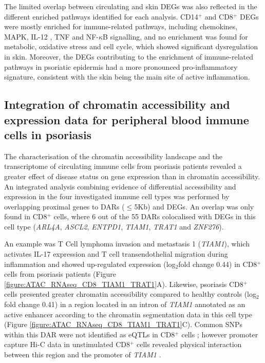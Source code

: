 The limited overlap between circulating and skin DEGs was also reflected in the different enriched pathways identified for each analysis. CD14$^+$ and CD8$^+$ DEGs were mostly enriched for immune-related pathways, including chemokines, MAPK, IL-12 , TNF and NF-$\kappa$B signalling, and no enrichment was found for metabolic, oxidative stress and cell cycle, which showed significant dysregulation in skin. %
Moreover, the DEGs contributing to the enrichment of immune-related pathways in psoriatic epidermis had a more pronounced pro-inflammatory signature, consistent with the skin being the main site of active inflammation.


\subsection{Integration of chromatin accessibility and expression data for peripheral blood immune cells in psoriasis}
The characterisation of the chromatin accessibility landscape and the transcriptome of circulating immune cells from psoriasis patients revealed a greater effect of disease status on gene expression than in chromatin accessibility. An integrated analysis combining evidence of differential accessibility and expression in the four investigated immune cell types was performed by overlapping proximal genes to DARs ($\leq$5Kb) and DEGs. An overlap was only found in CD8$^+$ cells, where 6 out of the 55 DARs colocalised with DEGs in this cell type (\textit{ARL4A}, \textit{ASCL2}, \textit{ENTPD1}, \textit{TIAM1}, \textit{TRAT1} and \textit{ZNF276}).

An example was T Cell lymphoma invasion and metastasis 1 (\textit{TIAM1}), which activates IL-17 expression and T cell transendothelial migration during inflammation \parencite{Kurdi2016, Gerard2009} and showed up-regulated expression (log$_2$fold change 0.44) in CD8$^+$ cells from psoriasis patients (Figure \ref{figure:ATAC_RNAseq_CD8_TIAM1_TRAT1}A). Likewise, psoriasis CD8$^+$ cells presented greater chromatin accessibility compared to healthy controls (log$_2$fold change 0.41) in a region located in an intron of \textit{TIAM1} annotated as an active enhancer according to the chromatin segmentation data in this cell type (Figure \ref{figure:ATAC_RNAseq_CD8_TIAM1_TRAT1}C). Common SNPs within this DAR were not identified as eQTLs in CD8$^+$ cells \parencite{Kasela2017}; however promoter capture Hi-C data in unstimulated CD8$^+$ cells revealed physical interaction between this region and the promoter of \textit{TIAM1} \parencite{Javierre2016}. 

